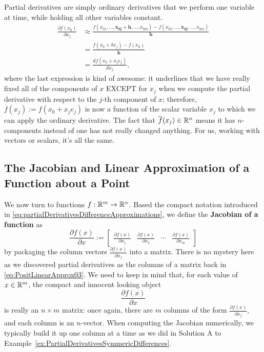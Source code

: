 \begin{tcolorbox}[title=\textbf{Partial Wisdom}]
Partial derivatives are simply ordinary derivatives that we perform one variable at time, while holding all other variables constant.\\
\begin{equation}
    \label{eq:PartialDerivativeForwardDifferenceWisdom}
    \begin{aligned}
          \frac{\partial f(x_0)}{\partial x_j} &\approx \frac{f(x_{01},\ldots, \mathbf{x_{0j} + h}, \ldots, x_{0m}) - f(x_{01}, \ldots,\mathbf{x_{0j}}, \ldots,  x_{0m})}{\mathbf{h}} \\
          &= \frac{f(x_{0} + h e_j) - f(x_0)}{\mathbf{h}}\\
          &= \frac{df(x_0 + x_j e_j)}{dx_j},
    \end{aligned}
\end{equation}
where the last expression is kind of awesome: it underlines that we have really fixed all of the components of $x$ EXCEPT for $x_j$ when we compute the partial derivative with respect to the $j$-th component of $x$; therefore, $\overline{f}(x_j):=f(x_0 + x_j e_j)$ is now a function of the scalar variable $x_j$ to which we can apply the ordinary derivative. The fact that $\overline{f}(x_j)\in \mathbb R^n$ means it has $n$-components instead of one has not really changed anything. For us, working with vectors or scalars, it's all the same.
\end{tcolorbox}   
  
  
\subsection{The Jacobian and Linear Approximation of a Function about a Point}

We now turn to functions $f:\mathbb R^m \to \mathbb R^n$. Based the compact notation introduced in \eqref{eq:partialDerivativesDifferenceApproximations}, we define the \textbf{Jacobian of a function} as
\begin{equation}
    \label{eq:DefJacobian}
    \frac{\partial f(x)}{\partial x}:=  \left[\begin{array}{cccc}
      \frac{\partial f(x)}{\partial x_1} & \frac{\partial f(x)}{\partial x_2} & \cdots & \frac{\partial f(x)}{\partial x_m}
    \end{array} \right]
\end{equation}
by packaging the column vectors $\frac{\partial f(x)}{\partial x_j}$ into a matrix. There is no mystery here as we discovered partial derivatives as the columns of a matrix back in \eqref{eq:PositLinearApprox03}. We need to keep in mind that, for each value of $x\in \mathbb R^m$, the compact and innocent looking object
$$ \frac{\partial f(x)}{\partial x} $$
is really an $n \times m$ matrix: once again, there are $m$ columns of the form $ \frac{\partial f(x)}{\partial x_j}$, and each column is an $n$-vector. When computing the Jacobian numerically, we typically build it up one column at a time as we did in Solution A to Example~\ref{ex:PartialDerivativesSymmericDifferences}. 


